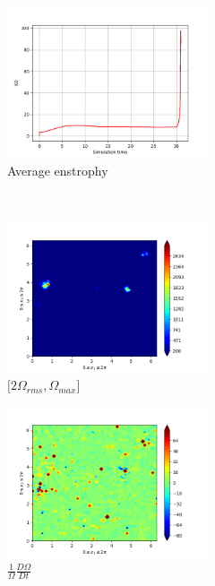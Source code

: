 \begin{figure}[H]
    \begin{subfigure}[H]{0.45\textwidth}
        \includegraphics[height=1.75in]{media/run-cds-65/enst-average1440.png}
        \caption{Average enstrophy}
    \end{subfigure}
    ~
    \begin{subfigure}[H]{0.45\textwidth}
        \includegraphics[height=1.75in]{media/run-cds-65/enst-2-1440.png}
        \caption{$[2\Omega_{rms}, \Omega_{max} $] }
    \end{subfigure}
    \newline
    \begin{subfigure}[H]{0.45\textwidth}
        \includegraphics[height=1.75in]{media/run-cds-65/enst-1440.png}
        \caption{$\frac{1}{\Omega} \frac{D \Omega}{Dt}$}
    \end{subfigure}
    ~
    \begin{subfigure}{0.45\textwidth}

\end{subfigure}
\end{figure}
